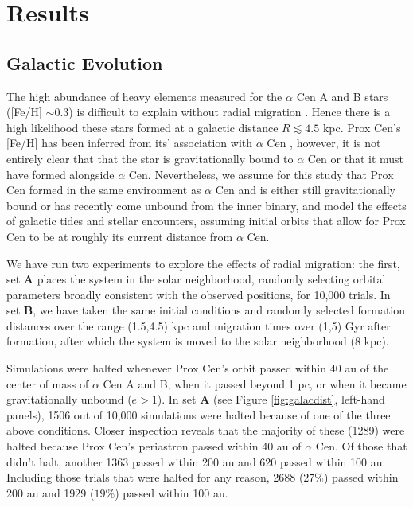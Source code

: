 \documentclass[preprint,12pt]{aastex}
\begin{document}
\section{Results\label{sec:results}}

\subsection{Galactic Evolution}
\label{sec:results:galactic}
The high abundance of heavy elements measured for the $\alpha$ Cen 
A and B stars ([Fe/H] $\sim 0.3$) is difficult to explain without radial 
migration \citep{Kordopatis15,Loebman16}. Hence there is a high likelihood 
these stars formed at a galactic distance $R\lesssim 4.5$ kpc. Prox Cen's [Fe/H] 
has been inferred from its' association with $\alpha$ Cen \citep{Johnson2009},
however, it is not entirely clear that that the star is gravitationally bound to 
$\alpha$ Cen \citep{MatvienkoOrlov14} or that it must have formed alongside 
$\alpha$ Cen. Nevertheless, we assume for this study that Prox Cen formed in 
the same environment as $\alpha$ Cen and is either still gravitationally bound or
has recently come unbound from the inner binary, and model the effects of 
galactic tides and stellar encounters, assuming initial orbits that allow for 
Prox Cen to be at roughly its current distance from $\alpha$ Cen.

We have run two experiments to explore the effects of radial migration: the first, 
set \textbf{A} places the system in the solar neighborhood, randomly selecting 
orbital parameters broadly consistent with the observed positions, for 10,000 
trials. In set \textbf{B}, we have taken the same initial conditions and randomly 
selected formation distances over the range (1.5,4.5) kpc and migration times
over (1,5) Gyr after formation, after which the system is moved to the solar 
neighborhood (8 kpc). 

Simulations were halted whenever Prox Cen's orbit passed within 40 au of 
the center of mass of $\alpha$ Cen A and B, when it passed beyond 1 pc,
or when it became gravitationally unbound ($e > 1$). In set \textbf{A} 
(see Figure \ref{fig:galacdist}, left-hand panels), 1506 
out of 10,000 simulations were halted because of one of the three above conditions.
Closer inspection reveals that the majority of these (1289) were halted because 
Prox Cen's periastron passed within 40 au of $\alpha$ Cen. Of those that didn't
halt, another 1363 passed within 200 au and 620 passed within 100 au. Including 
those trials that were halted for any reason, 2688 ($27\%$) passed within 200 au and
1929 ($19\%$) passed within 100 au. 
\end{document}
